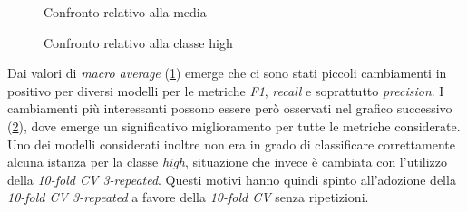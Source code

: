         \begin{figure}[!h]
            \noindent{}
            \centering
            \caption{Confronto relativo alla media}
            \label{fig:out_confrontoavg}
        \end{figure}
    
        \begin{figure}[!h]
            \noindent{}
            \centering
            \caption{Confronto relativo alla classe high}
            \label{fig:out_confrontohigh}
        \end{figure}
        
        \newpage
        Dai valori di \textit{macro average} (\ref{fig:out_confrontoavg}) emerge che ci sono stati piccoli cambiamenti in positivo per diversi modelli per le metriche \textit{F1}, \textit{recall} e soprattutto \textit{precision}. I cambiamenti più interessanti possono essere però osservati nel grafico successivo (\ref{fig:out_confrontohigh}), dove emerge un significativo miglioramento per tutte le metriche considerate. Uno dei modelli considerati inoltre non era in grado di classificare correttamente alcuna istanza per la classe \textit{high}, situazione che invece è cambiata con l'utilizzo della \textit{10-fold CV 3-repeated}. Questi motivi hanno quindi spinto all'adozione della \textit{10-fold CV 3-repeated} a favore della \textit{10-fold CV} senza ripetizioni.
        
